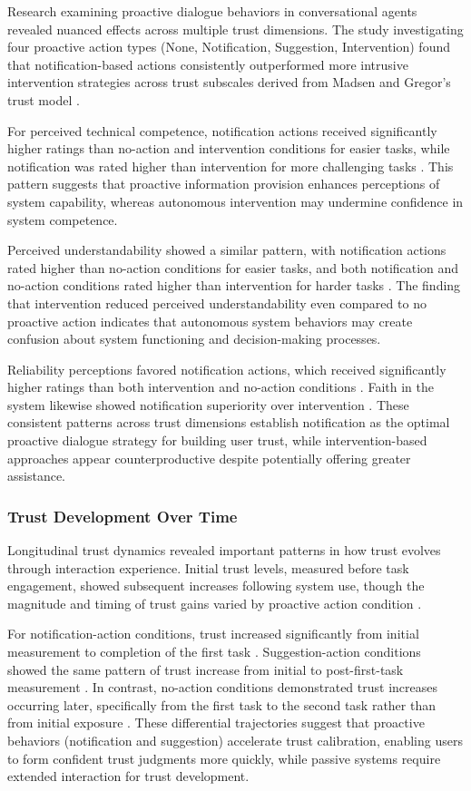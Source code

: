 \documentclass[manuscript,anonymous,sigconf]{acmart}
\begin{document}
Research examining proactive dialogue behaviors in conversational agents revealed nuanced effects across multiple trust dimensions. The study investigating four proactive action types (None, Notification, Suggestion, Intervention) found that notification-based actions consistently outperformed more intrusive intervention strategies across trust subscales derived from Madsen and Gregor's trust model \cite{A16}.

For perceived technical competence, notification actions received significantly higher ratings than no-action and intervention conditions for easier tasks, while notification was rated higher than intervention for more challenging tasks \cite{A16}. This pattern suggests that proactive information provision enhances perceptions of system capability, whereas autonomous intervention may undermine confidence in system competence.

Perceived understandability showed a similar pattern, with notification actions rated higher than no-action conditions for easier tasks, and both notification and no-action conditions rated higher than intervention for harder tasks \cite{A16}. The finding that intervention reduced perceived understandability even compared to no proactive action indicates that autonomous system behaviors may create confusion about system functioning and decision-making processes.

Reliability perceptions favored notification actions, which received significantly higher ratings than both intervention and no-action conditions \cite{A16}. Faith in the system likewise showed notification superiority over intervention \cite{A16}. These consistent patterns across trust dimensions establish notification as the optimal proactive dialogue strategy for building user trust, while intervention-based approaches appear counterproductive despite potentially offering greater assistance.

\subsubsection{Trust Development Over Time}

Longitudinal trust dynamics revealed important patterns in how trust evolves through interaction experience. Initial trust levels, measured before task engagement, showed subsequent increases following system use, though the magnitude and timing of trust gains varied by proactive action condition \cite{A16}.

For notification-action conditions, trust increased significantly from initial measurement to completion of the first task \cite{A16}. Suggestion-action conditions showed the same pattern of trust increase from initial to post-first-task measurement \cite{A16}. In contrast, no-action conditions demonstrated trust increases occurring later, specifically from the first task to the second task rather than from initial exposure \cite{A16}. These differential trajectories suggest that proactive behaviors (notification and suggestion) accelerate trust calibration, enabling users to form confident trust judgments more quickly, while passive systems require extended interaction for trust development.
\end{document}
